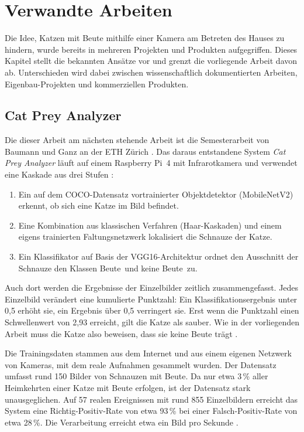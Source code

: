 \chapter{Verwandte Arbeiten}
\label{sec:verwandte_arbeiten}

Die Idee, Katzen mit Beute mithilfe einer Kamera am Betreten des Hauses zu hindern, wurde bereits in mehreren Projekten und Produkten aufgegriffen. Dieses Kapitel stellt die bekannten Ansätze vor und grenzt die vorliegende Arbeit davon ab. Unterschieden wird dabei zwischen wissenschaftlich dokumentierten Arbeiten, Eigenbau-Projekten und kommerziellen Produkten.

\section{Cat Prey Analyzer}
\label{sec:rw_baumann}
Die dieser Arbeit am nächsten stehende Arbeit ist die Semesterarbeit von Baumann und Ganz an der ETH Zürich \cite{baumann2020smartcatflap}. Das daraus entstandene System \emph{Cat Prey Analyzer} läuft auf einem Raspberry Pi~4 mit Infrarotkamera und verwendet eine Kaskade aus drei Stufen \cite{baumann2020smartcatflap, raspberrypi2020prey}:

\begin{enumerate}
	\item Ein auf dem COCO-Datensatz \cite{lin2014coco} vortrainierter Objektdetektor (MobileNetV2) erkennt, ob sich eine Katze im Bild befindet.
	\item Eine Kombination aus klassischen Verfahren (Haar-Kaskaden) und einem eigens trainierten Faltungsnetzwerk lokalisiert die Schnauze der Katze.
	\item Ein Klassifikator auf Basis der VGG16-Architektur ordnet den Ausschnitt der Schnauze den Klassen \glqq Beute\grqq\ und \glqq keine Beute\grqq\ zu.
\end{enumerate}

Auch dort werden die Ergebnisse der Einzelbilder zeitlich zusammengefasst. Jedes Einzelbild verändert eine kumulierte Punktzahl: Ein Klassifikationsergebnis unter 0,5 erhöht sie, ein Ergebnis über 0,5 verringert sie. Erst wenn die Punktzahl einen Schwellenwert von 2,93 erreicht, gilt die Katze als sauber. Wie in der vorliegenden Arbeit muss die Katze also beweisen, dass sie keine Beute trägt \cite{baumann2020smartcatflap}.

Die Trainingsdaten stammen aus dem Internet und aus einem eigenen Netzwerk von Kameras, mit dem reale Aufnahmen gesammelt wurden. Der Datensatz umfasst rund 150 Bilder von Schnauzen mit Beute. Da nur etwa 3\,\% aller Heimkehrten einer Katze mit Beute erfolgen, ist der Datensatz stark unausgeglichen. Auf 57 realen Ereignissen mit rund 855 Einzelbildern erreicht das System eine Richtig-Positiv-Rate von etwa 93\,\% bei einer Falsch-Positiv-Rate von etwa 28\,\%. Die Verarbeitung erreicht etwa ein Bild pro Sekunde \cite{baumann2020smartcatflap, raspberrypi2020prey}.

